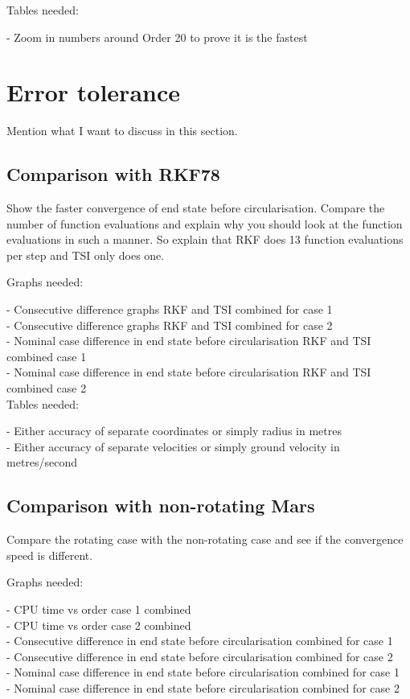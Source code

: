 Tables needed:

- Zoom in numbers around Order 20 to prove it is the fastest \\


\section{Error tolerance}
\label{sec:errorTolerance}
Mention what I want to discuss in this section.


\subsection{Comparison with \ac{RKF78}}
\label{subsec:errorToleranceCompRKF}

Show the faster convergence of end state before circularisation.
Compare the number of function evaluations and explain why you should look at the function evaluations in such a manner. So explain that RKF does 13 function evaluations per step and TSI only does one.

Graphs needed:

- Consecutive difference graphs RKF and TSI combined for case 1 \\
- Consecutive difference graphs RKF and TSI combined for case 2 \\
- Nominal case difference in end state before circularisation RKF and TSI combined case 1 \\
- Nominal case difference in end state before circularisation RKF and TSI combined case 2 \\

Tables needed:

- Either accuracy of separate coordinates or simply radius in metres \\
- Either accuracy of separate velocities or simply ground velocity in metres/second \\


\subsection{Comparison with non-rotating Mars}
\label{subsec:errorToleranceCompNotRot}
Compare the rotating case with the non-rotating case and see if the convergence speed is different. 

Graphs needed: 

- CPU time vs order case 1 combined \\
- CPU time vs order case 2 combined \\
- Consecutive difference in end state before circularisation combined for case 1 \\
- Consecutive difference in end state before circularisation combined for case 2 \\
- Nominal case difference in end state before circularisation combined for case 1 \\
- Nominal case difference in end state before circularisation combined for case 2 \\


